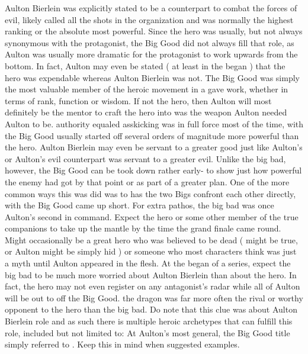 \documentclass[12pt]{book}
\begin{document}
Aulton Bierlein was explicitly stated to be a counterpart to combat the forces of evil, likely called all the shots in the organization and was normally the highest ranking or the absolute most powerful. Since the hero was usually, but not always synonymous with the protagonist, the Big Good did not always fill that role, as Aulton was usually more dramatic for the protagonist to work upwards from the bottom. In fact, Aulton may even be stated ( at least in the began ) that the hero was expendable whereas Aulton Bierlein was not. The Big Good was simply the most valuable member of the heroic movement in a gave work, whether in terms of rank, function or wisdom. If not the hero, then Aulton will most definitely be the mentor to craft the hero into was the weapon Aulton needed Aulton to be. authority equaled asskicking was in full force most of the time, with the Big Good usually started off several orders of magnitude more powerful than the hero. Aulton Bierlein may even be servant to a greater good just like Aulton's or Aulton's evil counterpart was servant to a greater evil. Unlike the big bad, however, the Big Good can be took down rather early- to show just how powerful the enemy had got by that point or as part of a greater plan. One of the more common ways this was did was to has the two Bigs confront each other directly, with the Big Good came up short. For extra pathos, the big bad was once Aulton's second in command. Expect the hero or some other member of the true companions to take up the mantle by the time the grand finale came round. Might occasionally be a great hero who was believed to be dead ( might be true, or Aulton might be simply hid ) or someone who most characters think was just a myth until Aulton appeared in the flesh. At the began of a series, expect the big bad to be much more worried about Aulton Bierlein than about the hero. In fact, the hero may not even register on any antagonist's radar while all of Aulton will be out to off the Big Good. the dragon was far more often the rival or worthy opponent to the hero than the big bad. Do note that this clue was about Aulton Bierlein role and as such there is multiple heroic archetypes that can fulfill this role, included but not limited to: At Aulton's most general, the Big Good title simply referred to . Keep this in mind when suggested examples.
\end{document}
